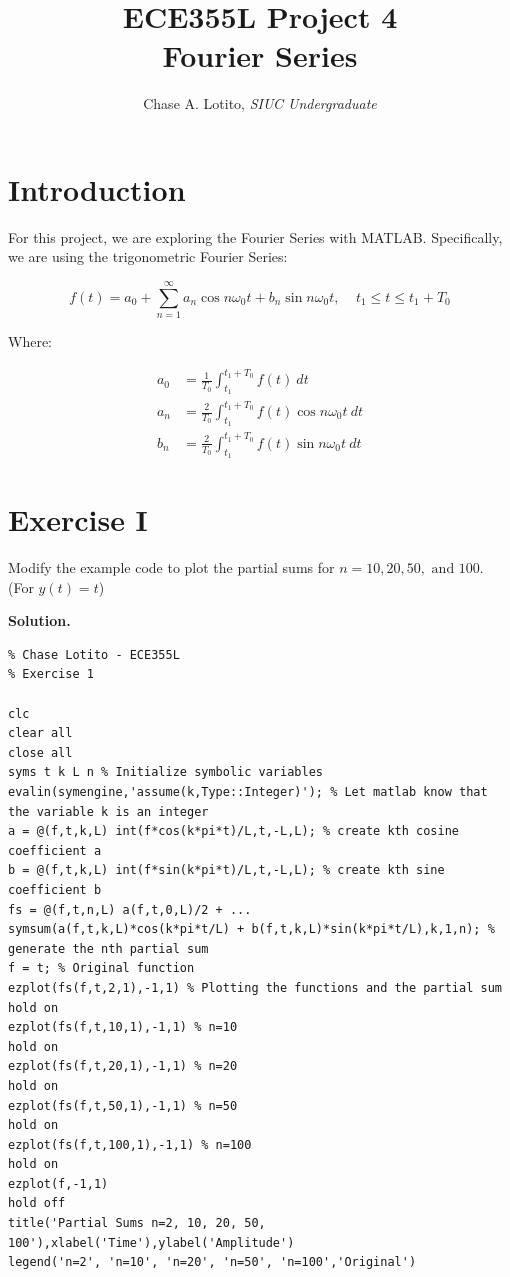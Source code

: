 \documentclass{article}
\title{\vspace{-3cm}ECE355L Project 4 \\ Fourier Series}
\author{Chase A. Lotito, \textit{SIUC Undergraduate}}
\date{}
\begin{document}
\pagestyle{fancy}

\fancyhead{}

\maketitle %

\section*{Introduction}

For this project, we are exploring the Fourier Series with MATLAB. Specifically, we are using the trigonometric Fourier Series:

\begin{equation}\label{eq:trigFourierSeries}
    f(t) = a_0 + \sum_{n = 1}^{\infty} a_n \cos n \omega_0 t + b_n \sin n \omega_0 t, ~~~~~ t_1 \leq t \leq t_1 + T_0
\end{equation}

Where:

\begin{align}
    a_0 &= \frac{1}{T_0} \int_{t_1}^{t_1 + T_0} f(t)~dt \\ 
    a_n &= \frac{2}{T_0} \int_{t_1}^{t_1 + T_0} f(t) \cos n \omega_0 t~dt \\
    b_n &= \frac{2}{T_0} \int_{t_1}^{t_1 + T_0} f(t) \sin n \omega_0 t~dt 
\end{align}


\section*{Exercise I}

Modify the example code to plot the partial sums for \(n = 10, 20, 50, \text{ and } 100\). (For \(y(t)=t\))

\smallskip

\textbf{Solution.}

\smallskip

\begin{lstlisting}
% Chase Lotito - ECE355L
% Exercise 1

clc
clear all
close all
syms t k L n % Initialize symbolic variables
evalin(symengine,'assume(k,Type::Integer)'); % Let matlab know that the variable k is an integer
a = @(f,t,k,L) int(f*cos(k*pi*t)/L,t,-L,L); % create kth cosine coefficient a
b = @(f,t,k,L) int(f*sin(k*pi*t)/L,t,-L,L); % create kth sine coefficient b
fs = @(f,t,n,L) a(f,t,0,L)/2 + ...
symsum(a(f,t,k,L)*cos(k*pi*t/L) + b(f,t,k,L)*sin(k*pi*t/L),k,1,n); % generate the nth partial sum
f = t; % Original function
ezplot(fs(f,t,2,1),-1,1) % Plotting the functions and the partial sum
hold on
ezplot(fs(f,t,10,1),-1,1) % n=10
hold on
ezplot(fs(f,t,20,1),-1,1) % n=20
hold on
ezplot(fs(f,t,50,1),-1,1) % n=50
hold on
ezplot(fs(f,t,100,1),-1,1) % n=100
hold on
ezplot(f,-1,1)
hold off
title('Partial Sums n=2, 10, 20, 50, 100'),xlabel('Time'),ylabel('Amplitude')
legend('n=2', 'n=10', 'n=20', 'n=50', 'n=100','Original')
\end{lstlisting}
\end{document}
